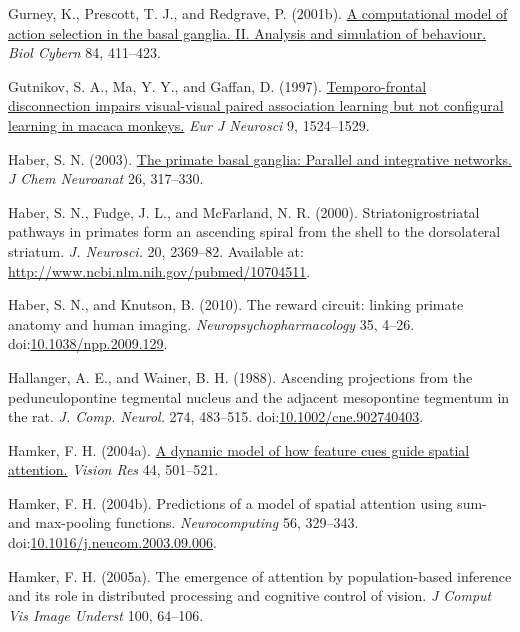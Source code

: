 \documentclass[
  11pt,
  a4paper,
]{scrbook}
\newlength{\cslhangindent}
\newenvironment{CSLReferences}[2] %
 {\begin{list}{}{%
  \setlength{\itemindent}{0pt}
  \setlength{\leftmargin}{0pt}
  \setlength{\parsep}{0pt}
  \ifodd #1
   \setlength{\leftmargin}{\cslhangindent}
   \setlength{\itemindent}{-1\cslhangindent}
  \fi
  \setlength{\itemsep}{#2\baselineskip}}}
 {\end{list}}
\begin{document}
\begin{CSLReferences}{1}{1}
Gurney, K., Prescott, T. J., and Redgrave, P. (2001b).
\href{https://www.ncbi.nlm.nih.gov/pubmed/11417053}{A computational
model of action selection in the basal ganglia. {II. Analysis} and
simulation of behaviour.} \emph{Biol Cybern} 84, 411--423.

Gutnikov, S. A., Ma, Y. Y., and Gaffan, D. (1997).
\href{https://www.ncbi.nlm.nih.gov/pubmed/9240410}{Temporo-frontal
disconnection impairs visual-visual paired association learning but not
configural learning in macaca monkeys.} \emph{Eur J Neurosci} 9,
1524--1529.

Haber, S. N. (2003).
\href{https://www.ncbi.nlm.nih.gov/pubmed/14729134}{The primate basal
ganglia: Parallel and integrative networks.} \emph{J Chem Neuroanat} 26,
317--330.

Haber, S. N., Fudge, J. L., and McFarland, N. R. (2000).
{Striatonigrostriatal pathways in primates form an ascending spiral from
the shell to the dorsolateral striatum.} \emph{J. Neurosci.} 20,
2369--82. Available at:
\url{http://www.ncbi.nlm.nih.gov/pubmed/10704511}.

Haber, S. N., and Knutson, B. (2010). {The reward circuit: linking
primate anatomy and human imaging.} \emph{Neuropsychopharmacology} 35,
4--26.
doi:\href{https://doi.org/10.1038/npp.2009.129}{10.1038/npp.2009.129}.

Hallanger, A. E., and Wainer, B. H. (1988). {Ascending projections from
the pedunculopontine tegmental nucleus and the adjacent mesopontine
tegmentum in the rat.} \emph{J. Comp. Neurol.} 274, 483--515.
doi:\href{https://doi.org/10.1002/cne.902740403}{10.1002/cne.902740403}.

Hamker, F. H. (2004a).
\href{https://www.ncbi.nlm.nih.gov/pubmed/14680776}{A dynamic model of
how feature cues guide spatial attention.} \emph{Vision Res} 44,
501--521.

Hamker, F. H. (2004b). {Predictions of a model of spatial attention
using sum- and max-pooling functions}. \emph{Neurocomputing} 56,
329--343.
doi:\href{https://doi.org/10.1016/j.neucom.2003.09.006}{10.1016/j.neucom.2003.09.006}.

Hamker, F. H. (2005a). The emergence of attention by population-based
inference and its role in distributed processing and cognitive control
of vision. \emph{J Comput Vis Image Underst} 100, 64--106.


\end{CSLReferences}
\end{document}
